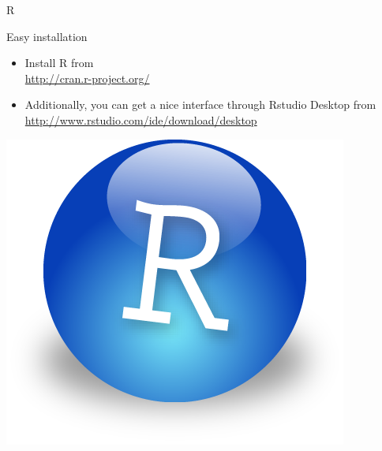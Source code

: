 \documentclass[10pt]{beamer}
\begin{document}


\begin{frame}{R}
  \begin{block}{Easy installation}
    \begin{itemize}
    \item Install R from  \\ \url{http://cran.r-project.org/}
      \bigskip
    \item Additionally, you can get a nice interface through Rstudio Desktop from \\ \url{http://www.rstudio.com/ide/download/desktop}
    \end{itemize}
  \end{block}
  \centering
  \bigskip
  \includegraphics[page=1,height=.3\textheight]{../imgs/Rstudio.png}

\end{frame}

\end{document}
